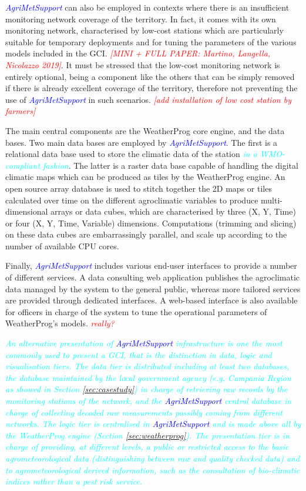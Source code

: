 \documentclass[authoryear,preprint,review,12pt]{elsarticle}
\newcommand{\note}[1]{\emph{\textcolor{red}{#1}}}
\newcommand{\update}[1]{\emph{\textcolor{blue}{#1}}}
\newcommand{\review}[1]{\emph{\textcolor{cyan}{#1}}}
\newcommand{\gci}{\update{AgriMetSupport}\xspace}
\begin{document}
\gci can also be employed in contexts where there is an insufficient monitoring network coverage of the territory.
In fact, it comes with its own monitoring network, characterised by low-cost stations which are particularly suitable for temporary deployments and for tuning the parameters of the various models included in the GCI.  \note{[MINI + FULL PAPER: Martino, Langella, Nicolazzo 2019]}.
It must be stressed that the low-cost monitoring network is entirely optional, being a component like the others that can be simply removed if there is already excellent coverage of the territory, therefore not preventing the use of \gci in such scenarios. \note{[add installation of low cost station by farmers]}

The main central components are the WeatherProg core engine, and the data bases. Two main data bases are employed by \gci.
The first is a relational data base used to store the climatic data of the station  \review{in a WMO-compliant fashion}.
The latter  is a raster data base capable of handling the digital climatic maps which can be produced as tiles by the WeatherProg engine.
An open source array database is used to stitch together the 2D maps or tiles calculated over time on the different agroclimatic variables to produce multi-dimensional arrays or data cubes, which are  characterised by three (X, Y, Time) or four (X, Y, Time, Variable) dimensions.
Computations (trimming and slicing) on these data cubes are embarrassingly parallel, and scale up according to the number of available CPU cores.

Finally, \gci includes various end-user interfaces to provide a number of different services. A data consulting web application publishes the agroclimatic data managed by the system to the general public, whereas more tailored services are provided through dedicated interfaces. A web-based interface is also available for officers in charge of the system to tune the operational parameters of WeatherProg's models. \note{really?}

\review{ An alternative presentation of \gci infrastructure is one the most commonly used to present a GCI, that is the distinction in data, logic and visualisation tiers.
The data tier is distributed including at least two databases, the database maintained by the local government agency (e.g. Campania Region as showed in Section \ref{sec:casestudy}) in charge of retrieving raw records by the monitoring stations of the network, and the \gci central database in charge of collecting decoded raw measurements possibly coming from different networks.
The logic tier is centralised in \gci and is made above all by the WeatherProg engine (Section \ref{sec:weatherprog}).
The presentation tier is in charge of providing, at different levels, a public or restricted access to the basic agrometeorological data (distinguishing between raw and quality checked data) and to agrometeorological derived information, such as the consultation of bio-climatic indices rather than a pest risk service. }
\end{document}
